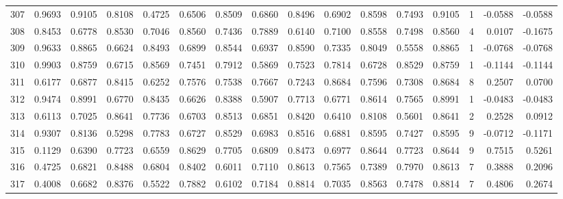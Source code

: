 \begin{tabular}{lrrrrrrrrrrrrrrr}
307 &      0.9693 &  0.9105 &  0.8108 &  0.4725 &  0.6506 &  0.8509 &  0.6860 &  0.8496 &  0.6902 &  0.8598 &   0.7493 &     0.9105 &      1 &                   -0.0588 &                    -0.0588 \\
308 &      0.8453 &  0.6778 &  0.8530 &  0.7046 &  0.8560 &  0.7436 &  0.7889 &  0.6140 &  0.7100 &  0.8558 &   0.7498 &     0.8560 &      4 &                    0.0107 &                    -0.1675 \\
309 &      0.9633 &  0.8865 &  0.6624 &  0.8493 &  0.6899 &  0.8544 &  0.6937 &  0.8590 &  0.7335 &  0.8049 &   0.5558 &     0.8865 &      1 &                   -0.0768 &                    -0.0768 \\
310 &      0.9903 &  0.8759 &  0.6715 &  0.8569 &  0.7451 &  0.7912 &  0.5869 &  0.7523 &  0.7814 &  0.6728 &   0.8529 &     0.8759 &      1 &                   -0.1144 &                    -0.1144 \\
311 &      0.6177 &  0.6877 &  0.8415 &  0.6252 &  0.7576 &  0.7538 &  0.7667 &  0.7243 &  0.8684 &  0.7596 &   0.7308 &     0.8684 &      8 &                    0.2507 &                     0.0700 \\
312 &      0.9474 &  0.8991 &  0.6770 &  0.8435 &  0.6626 &  0.8388 &  0.5907 &  0.7713 &  0.6771 &  0.8614 &   0.7565 &     0.8991 &      1 &                   -0.0483 &                    -0.0483 \\
313 &      0.6113 &  0.7025 &  0.8641 &  0.7736 &  0.6703 &  0.8513 &  0.6851 &  0.8420 &  0.6410 &  0.8108 &   0.5601 &     0.8641 &      2 &                    0.2528 &                     0.0912 \\
314 &      0.9307 &  0.8136 &  0.5298 &  0.7783 &  0.6727 &  0.8529 &  0.6983 &  0.8516 &  0.6881 &  0.8595 &   0.7427 &     0.8595 &      9 &                   -0.0712 &                    -0.1171 \\
315 &      0.1129 &  0.6390 &  0.7723 &  0.6559 &  0.8629 &  0.7705 &  0.6809 &  0.8473 &  0.6977 &  0.8644 &   0.7723 &     0.8644 &      9 &                    0.7515 &                     0.5261 \\
316 &      0.4725 &  0.6821 &  0.8488 &  0.6804 &  0.8402 &  0.6011 &  0.7110 &  0.8613 &  0.7565 &  0.7389 &   0.7970 &     0.8613 &      7 &                    0.3888 &                     0.2096 \\
317 &      0.4008 &  0.6682 &  0.8376 &  0.5522 &  0.7882 &  0.6102 &  0.7184 &  0.8814 &  0.7035 &  0.8563 &   0.7478 &     0.8814 &      7 &                    0.4806 &                     0.2674 \\

\end{tabular}
